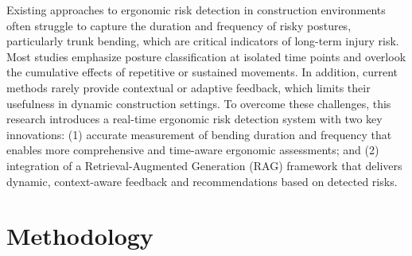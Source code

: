 \documentclass[11pt]{article}
\begin{document}

Existing approaches to ergonomic risk detection in construction environments often struggle to capture the duration and frequency of risky postures, particularly trunk bending, which are critical indicators of long-term injury risk. Most studies emphasize posture classification at isolated time points and overlook the cumulative effects of repetitive or sustained movements. In addition, current methods rarely provide contextual or adaptive feedback, which limits their usefulness in dynamic construction settings. To overcome these challenges, this research introduces a real-time ergonomic risk detection system with two key innovations: (1) accurate measurement of bending duration and frequency that enables more comprehensive and time-aware ergonomic assessments; and (2) integration of a Retrieval-Augmented Generation (RAG) framework that delivers dynamic, context-aware feedback and recommendations based on detected risks. 

\section{Methodology}
\end{document}

